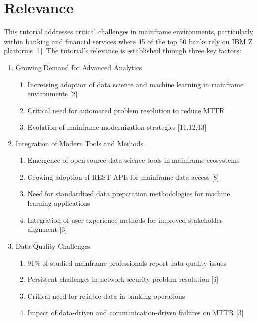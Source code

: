 \documentclass[a4paper]{article}
\begin{document}
\section{Relevance}
    This tutorial addresses critical challenges in mainframe environments, particularly within banking and financial services where 45 of the top 50 banks rely on IBM Z platforms [1]. The tutorial's relevance is established through three key factors:
    \begin{enumerate}
        \item Growing Demand for Advanced Analytics
        \begin{enumerate}
            \item Increasing adoption of data science and machine learning in mainframe environments [2]
            \item Critical need for automated problem resolution to reduce MTTR
            \item Evolution of mainframe modernization strategies [11,12,13]
        \end{enumerate}
        \item Integration of Modern Tools and Methods
            \begin{enumerate}
            \item Emergence of open-source data science tools in mainframe ecosystems
            \item Growing adoption of REST APIs for mainframe data access [8]
            \item Need for standardized data preparation methodologies for machine learning applications
            \item Integration of user experience methods for improved stakeholder alignment [3]
        \end{enumerate}
        \item Data Quality Challenges
        \begin{enumerate}
            \item 91\% of studied mainframe professionals report data quality issues
            \item Persistent challenges in network security problem resolution [6]
            \item Critical need for reliable data in banking operations
            \item Impact of data-driven and communication-driven failures on MTTR [3]
        \end{enumerate}            
    \end{enumerate}
\end{document}

